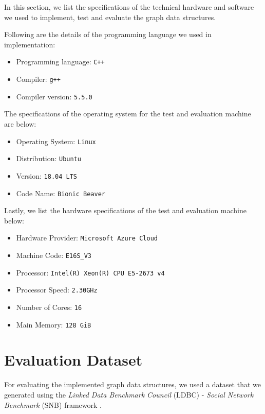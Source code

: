 {In this section, we list the specifications of the technical hardware and software we used to implement, test and evaluate the graph data structures.

Following are the details of the programming language we used in implementation:

\begin{itemize}
\item Programming language: \texttt{C++}
\item Compiler: \texttt{g++}
\item Compiler version: \texttt{5.5.0}
\end{itemize}

The specifications of the operating system for the test and evaluation machine are below:

\begin{itemize}
\item Operating System: \texttt{Linux}
\item Distribution: \texttt{Ubuntu}
\item Version: \texttt{18.04 LTS}
\item Code Name: \texttt{Bionic Beaver}
\end{itemize}

Lastly, we list the hardware specifications of the test and evaluation machine below:

\begin{itemize}
\item Hardware Provider: \texttt{Microsoft Azure Cloud}
\item Machine Code: \texttt{E16S\_V3}
\item Processor: \texttt{Intel(R) Xeon(R) CPU E5-2673 v4}
\item Processor Speed: \texttt{2.30GHz}
\item Number of Cores: \texttt{16}
\item Main Memory: \texttt{128 GiB}
\end{itemize}

\section{Evaluation Dataset}
\label{sec:dataset}

For evaluating the implemented graph data structures, we used a dataset that we generated using the \textit{Linked Data Benchmark Council} (LDBC) - \textit{Social Network Benchmark} (SNB) framework \cite{boncz2013ldbc, prat2017ldbc}.

}
